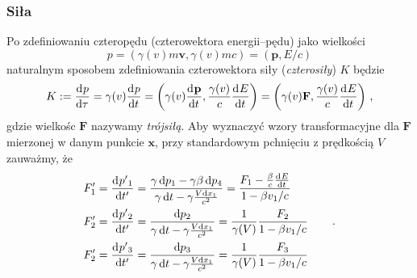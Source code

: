 \documentclass[../main.tex]{subfiles}
\begin{document}
\subsubsection{Siła}
Po zdefiniowaniu czteropędu (czterowektora energii--pędu) jako wielkości
\begin{equation*}
    p=(\gamma(v)m\mathbf{v},\gamma(v)mc)=(\mathbf{p},E/c)
\end{equation*}
naturalnym sposobem zdefiniowania czterowektora siły (\textit{czterosiły}) \(K\) będzie
\begin{equation*}
    K:=\dv[]{p}{\tau}=\gamma(v)\dv[]{p}{t}=\left(\gamma(v)\dv[]{\mathbf{p}}{t},\frac{\gamma(v)}{c}\dv[]{E}{t}\right)=\left(\gamma(v)\mathbf{F},\frac{\gamma(v)}{c}\dv[]{E}{t}\right)\,,
\end{equation*}
gdzie wielkośc \(\mathbf{F}\) nazywamy \textit{trójsiłą}. Aby wyznaczyć wzory transformacyjne dla
\(\mathbf{F}\) mierzonej w danym punkcie \(\mathbf{x}\), przy standardowym pchnięciu z prędkością
\(V\)zauważmy, że
\begin{equation*}
\begin{split}
    &F_1'=\dv[]{p{'}_1}{t{'}}=\frac{\gamma\dd{p_1}-\gamma\beta\dd{p_4}}{\gamma\dd{t}-\gamma\frac{V\dd{x_1}}{c^2}}=\frac{F_1-\frac{\beta}{c}\dv[]{E}{t}}{1-\beta v_1/c}\\
    &F_2'=\dv[]{p{'}_2}{t{'}}=\frac{\dd{p_2}}{\gamma\dd{t}-\gamma\frac{V\dd{x_1}}{c^2}}=\frac{1}{\gamma(V)}\frac{F_2}{1-\beta v_1/c}\\
    &F_2'=\dv[]{p{'}_3}{t{'}}=\frac{\dd{p_3}}{\gamma\dd{t}-\gamma\frac{V\dd{x_1}}{c^2}}=\frac{1}{\gamma(V)}\frac{F_3}{1-\beta v_1/c}
\end{split}\quad\quad\,.
\end{equation*}
\end{document}
